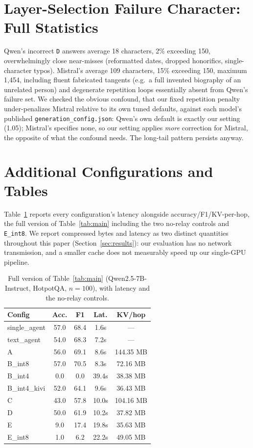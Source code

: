\documentclass[11pt]{article}
\begin{document}
\section{Layer-Selection Failure Character: Full Statistics}
\label{app:failurechar}

Qwen's incorrect \texttt{D} answers average 18 characters, 2\%
exceeding 150, overwhelmingly close near-misses (reformatted dates,
dropped honorifics, single-character typos). Mistral's average 109
characters, 15\% exceeding 150, maximum 1,454, including fluent
fabricated tangents (e.g.\ a full invented biography of an unrelated
person) and degenerate repetition loops essentially absent from Qwen's
failure set. We checked the obvious confound, that our fixed
repetition penalty under-penalizes Mistral relative to its own tuned
defaults, against each model's published \texttt{generation\_config.json}:
Qwen's own default is exactly our setting (1.05); Mistral's specifies
none, so our setting applies \emph{more} correction for Mistral, the
opposite of what the confound needs. The long-tail pattern persists
anyway.

\section{Additional Configurations and Tables}
\label{app:extratables}

Table~\ref{tab:full} reports every configuration's latency alongside
accuracy/F1/KV-per-hop, the full version of Table~\ref{tab:main}
including the two no-relay controls and \texttt{E\_int8}. We report
compressed bytes and latency as two distinct quantities throughout this
paper (Section~\ref{sec:results}): our evaluation has no network
transmission, and a smaller cache does not measurably speed up our
single-GPU pipeline.

\begin{table}[h]
\centering
\small
\begin{tabular}{lcccc}
\toprule
\textbf{Config} & \textbf{Acc.} & \textbf{F1} & \textbf{Lat.} & \textbf{KV/hop} \\
\midrule
single\_agent & 57.0 & 68.4 & 1.6s & --- \\
text\_agent & 54.0 & 68.3 & 7.2s & --- \\
A & 56.0 & 69.1 & 8.6s & 144.35 MB \\
B\_int8 & 57.0 & 70.5 & 8.3s & 72.16 MB \\
B\_int4 & 0.0 & 0.0 & 39.4s & 38.38 MB \\
B\_int4\_kivi & 52.0 & 64.1 & 9.6s & 36.43 MB \\
C & 43.0 & 57.8 & 10.0s & 104.16 MB \\
D & 50.0 & 61.9 & 10.2s & 37.82 MB \\
E & 9.0 & 17.4 & 19.8s & 35.63 MB \\
E\_int8 & 1.0 & 6.2 & 22.2s & 49.05 MB \\
\bottomrule
\end{tabular}
\caption{Full version of Table~\ref{tab:main} (Qwen2.5-7B-Instruct,
HotpotQA, $n=100$), with latency and the no-relay controls.}
\label{tab:full}
\end{table}
\end{document}
